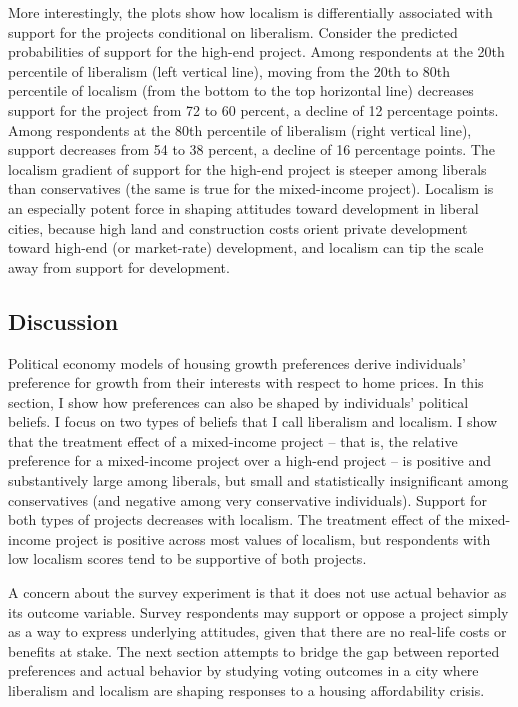 \documentclass[article,11pt]{memoir}
\begin{document}
More interestingly, the plots show how localism is differentially associated with support for the projects conditional on liberalism. Consider the predicted probabilities of support for the high-end project.  Among respondents at the 20th percentile of liberalism (left vertical line), moving from the 20th to 80th percentile of localism (from the bottom to the top horizontal line) decreases support for the project from 72 to 60 percent, a decline of 12 percentage points. Among respondents at the 80th percentile of liberalism (right vertical line), support decreases from 54 to 38 percent, a decline of 16 percentage points. The localism gradient of support for the high-end project is steeper among liberals than conservatives (the same is true for the mixed-income project).  Localism is an especially potent force in shaping attitudes toward development in liberal cities, because high land and construction costs orient private development toward high-end (or market-rate) development, and localism can tip the scale away from support for development.

\subsection{Discussion}

Political economy models of housing growth preferences derive individuals' preference for growth from their interests with respect to home prices.  In this section, I show how preferences can also be shaped by individuals' political beliefs.  I focus on two types of beliefs that I call liberalism and localism.  I show that the treatment effect of a mixed-income project -- that is, the relative preference for a mixed-income project over a high-end project -- is positive and substantively large among liberals, but small and statistically insignificant among conservatives (and negative among very conservative individuals).  Support for both types of projects decreases with localism. The treatment effect of the mixed-income project is positive across most values of localism, but respondents with low localism scores tend to be supportive of both projects.

A concern about the survey experiment is that it does not use actual behavior as its outcome variable.  Survey respondents may support or oppose a project simply as a way to express underlying attitudes, given that there are no real-life costs or benefits at stake.  The next section attempts to bridge the gap between reported preferences and actual behavior by studying voting outcomes in a city  where liberalism and localism are shaping responses to a housing affordability crisis.
\end{document}
